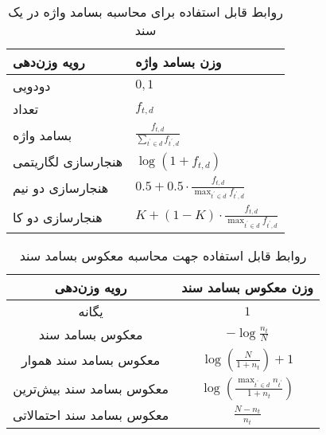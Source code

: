 \begin{table}[h!]
	\caption{روابط قابل استفاده برای محاسبه بسامد واژه در یک سند}
	\label{table.tf}
	\begin{center}
		\begin{tabular}{|M{5cm}|M{5cm}|}
			\hline
			رویه وزن‌دهی\footnotemark & وزن بسامد واژه \\
			\hline
			\hline
			دودویی\footnotemark & 
			$0, 1$ \\ \hline
			تعداد & 
			$f_{t, d}$ \\ \hline
			بسامد واژه & 
			$ \frac{f_{t,d}}{\sum_{t^{'} \in d} f_{t^{'}, d}}$ \\ \hline
			هنجارسازی لگاریتمی\footnotemark & 
			$\log(1 + f_{t, d})$ \\ \hline
			هنجارسازی دو نیم\footnotemark & 
			$0.5 + ‌0.5\cdot \frac{f_{t, d}}{\max_{t^{'} \in d}{f_{t^{'}, d}}} $ \\ \hline
			هنجارسازی دو کا\footnotemark & 
			$K + (1 - K) \cdot \frac{f_{t, d}}{\max_{t^{'} \in d}{f_{t^{'}, d}}} $ \\ \hline
		\end{tabular}
	\end{center}
\end{table}
\begin{table}[h!]
	\caption{روابط قابل استفاده جهت محاسبه معکوس بسامد سند}
	\label{table.idf}
	\begin{center}
		\begin{tabular}{|c|c|}
			\hline
			رویه وزن‌دهی & وزن معکوس بسامد سند \\
			\hline
			\hline
			یگانه & 
			$1$ \\ \hline
			معکوس بسامد سند & 
			$-\log \frac{n_t}{N}$ \\ \hline
			معکوس بسامد سند هموار & 
			$\log(\frac{N}{1 +‌n_t}) + 1$ \\ \hline
			معکوس بسامد سند بیش‌ترین & 
			$\log(\frac{\max_{t^{'} \in d} n_{t^{'}}}{1 +‌n_t})$ \\ \hline
			معکوس بسامد سند احتمالاتی & 
			$\frac{N - n_t}{n_t}$ \\ \hline
		\end{tabular}
	\end{center}
\end{table}

